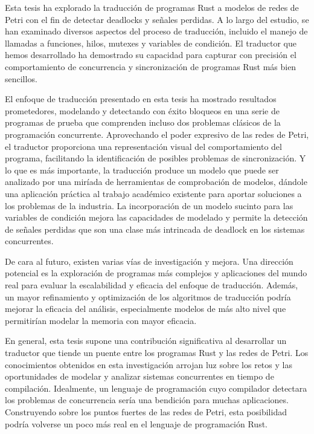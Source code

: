 Esta tesis ha explorado la traducción de programas Rust a modelos de redes de Petri con el fin
de detectar deadlocks y señales perdidas. A lo largo del estudio, se han examinado
diversos aspectos del proceso de traducción, incluido el manejo de llamadas a funciones,
hilos, mutexes y variables de condición. El traductor que hemos desarrollado ha demostrado su
capacidad para capturar con precisión el comportamiento de concurrencia y sincronización de
programas Rust más bien sencillos.

El enfoque de traducción presentado en esta tesis ha mostrado resultados prometedores,
modelando y detectando con éxito bloqueos en una serie de programas de prueba que
comprenden incluso dos problemas clásicos de la programación concurrente. Aprovechando el
poder expresivo de las redes de Petri, el traductor proporciona una representación visual del
comportamiento del programa, facilitando la identificación de posibles problemas de
sincronización. Y lo que es más importante, la traducción produce un modelo que puede ser
analizado por una miríada de herramientas de comprobación de modelos,
dándole una aplicación práctica al trabajo académico existente
para aportar soluciones a los problemas de la industria.
La incorporación de un modelo sucinto para las variables de condición mejora las capacidades de
modelado y permite la detección de señales perdidas que son una clase más intrincada de
deadlock en los sistemas concurrentes.

De cara al futuro, existen varias vías de investigación y mejora.
Una dirección potencial es la exploración de programas más complejos y aplicaciones del mundo real
para evaluar la escalabilidad y eficacia del enfoque de traducción.
Además, un mayor refinamiento y optimización de los algoritmos de traducción
podría mejorar la eficacia del análisis,
especialmente modelos de más alto nivel
que permitirían modelar la memoria con mayor eficacia.

En general, esta tesis supone una contribución significativa al desarrollar un traductor
que tiende un puente entre los programas Rust y las redes de Petri.
Los conocimientos obtenidos en esta investigación arrojan luz sobre los retos
y las oportunidades de modelar y analizar sistemas concurrentes en tiempo de compilación.
Idealmente, un lenguaje de programación cuyo compilador detectara los problemas de concurrencia
sería una bendición para muchas aplicaciones.
Construyendo sobre los puntos fuertes de las redes de Petri,
esta posibilidad podría volverse un poco más real en el lenguaje de programación Rust.

